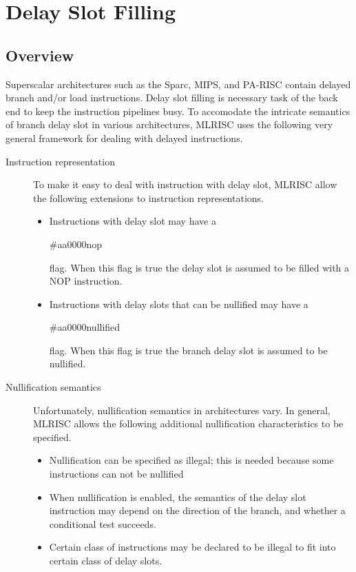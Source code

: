 \section{Delay Slot Filling}
\subsection{ Overview }

    Superscalar architectures such as the Sparc, MIPS, and PA-RISC
contain delayed branch and/or load instructions.  
Delay slot filling is necessary 
task of the back end to keep the instruction pipelines busy.  To accomodate
the intricate semantics of branch delay slot in various architectures, 
MLRISC uses the following very general framework for dealing with 
delayed instructions. 
   
\begin{description}
  \item[Instruction representation]
      To make it easy to deal with instruction with delay slot, MLRISC allow
       the following extensions to instruction representations.
  \begin{itemize}
    \item Instructions with delay slot may have a
        \begin{color}{#aa0000}nop\end{color} flag.   When this flag is true
        the delay slot is assumed to be filled with a NOP instruction.
    \item Instructions with delay slots that can be nullified may have a
        \begin{color}{#aa0000}nullified\end{color} flag.   
       When this flag is true the branch delay slot is assumed to be
       nullified.  
    \end{itemize}
   \item[Nullification semantics]
     Unfortunately, nullification semantics
        in architectures vary. In general, MLRISC allows the following
        additional nullification characteristics to be specified. 
     \begin{itemize}
     \item Nullification can be specified as illegal; this is needed 
           because some instructions can not be nullified
     \item When nullification is enabled, the semantics of the delay slot
          instruction may depend on the direction of the branch, and whether
          a conditional test succeeds. 
     \item Certain class of instructions may be declared to be illegal
          to fit into certain class of delay slots.
     \end{itemize}
\end{description} 

